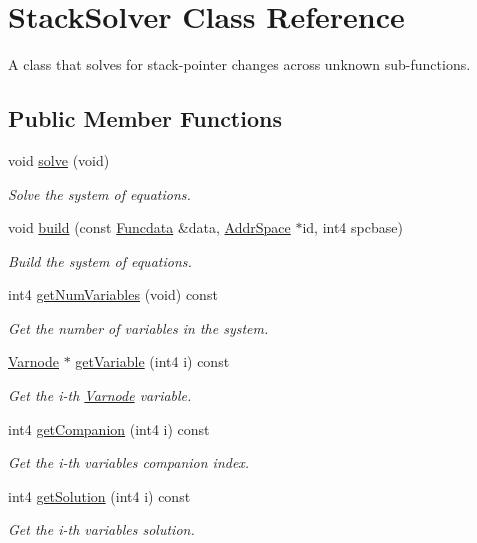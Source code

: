 \hypertarget{class_stack_solver}{}\section{Stack\+Solver Class Reference}
\label{class_stack_solver}


A class that solves for stack-\/pointer changes across unknown sub-\/functions.  


\subsection*{Public Member Functions}
\begin{DoxyCompactItemize}
\item 
void \mbox{\hyperlink{class_stack_solver_a441d8ed5d337ba9087093745d7e889c9}{solve}} (void)
\begin{DoxyCompactList}\small\item\em Solve the system of equations. \end{DoxyCompactList}\item 
void \mbox{\hyperlink{class_stack_solver_a136feaaa59c88d2a2b003621a78b0511}{build}} (const \mbox{\hyperlink{class_funcdata}{Funcdata}} \&data, \mbox{\hyperlink{class_addr_space}{Addr\+Space}} $\ast$id, int4 spcbase)
\begin{DoxyCompactList}\small\item\em Build the system of equations. \end{DoxyCompactList}\item 
int4 \mbox{\hyperlink{class_stack_solver_ad89900d198c2372dafd1b7d5c6f17787}{get\+Num\+Variables}} (void) const
\begin{DoxyCompactList}\small\item\em Get the number of variables in the system. \end{DoxyCompactList}\item 
\mbox{\hyperlink{class_varnode}{Varnode}} $\ast$ \mbox{\hyperlink{class_stack_solver_afde2924e2df5c143fd7749d812ec1909}{get\+Variable}} (int4 i) const
\begin{DoxyCompactList}\small\item\em Get the i-\/th \mbox{\hyperlink{class_varnode}{Varnode}} variable. \end{DoxyCompactList}\item 
int4 \mbox{\hyperlink{class_stack_solver_a0afca12bc9607e6846fd722e20265150}{get\+Companion}} (int4 i) const
\begin{DoxyCompactList}\small\item\em Get the i-\/th variable\textquotesingle{}s companion index. \end{DoxyCompactList}\item 
int4 \mbox{\hyperlink{class_stack_solver_a7e8e971724f289130344b0e52bed302e}{get\+Solution}} (int4 i) const
\begin{DoxyCompactList}\small\item\em Get the i-\/th variable\textquotesingle{}s solution. \end{DoxyCompactList}\end{DoxyCompactItemize}


